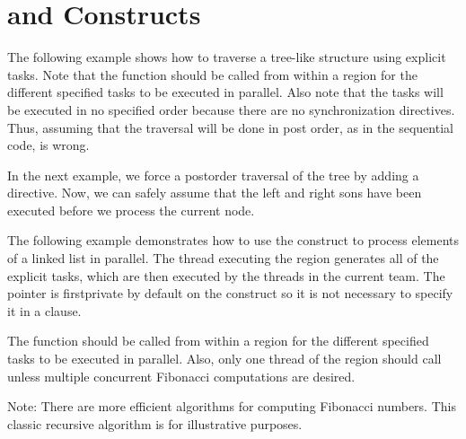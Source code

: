 \pagebreak
\section{ and  Constructs}
\label{sec:task_taskwait}

The following example shows how to traverse a tree-like structure using explicit 
tasks. Note that the  function should be called from within a 
 region for the different specified tasks to be executed in parallel. Also 
note that the tasks will be executed in no specified order because there are no 
synchronization directives. Thus, assuming that the traversal will be done in post 
order, as in the sequential code, is wrong.



In the next example, we force a postorder traversal of the tree by adding a  
directive. Now, we can safely assume that the left and right sons have been executed 
before we process the current node.



The following example demonstrates how to use the  construct to process 
elements of a linked list in parallel. The thread executing the  
region generates all of the explicit tasks, which are then executed by the threads 
in the current team. The pointer  is firstprivate by default 
on the  construct so it is not necessary to specify it in a  
clause.
%



The  function should be called from within a  region 
for the different specified tasks to be executed in parallel. Also, only one thread 
of the  region should call  unless multiple concurrent 
Fibonacci computations are desired. 


\clearpage

Note: There are more efficient algorithms for computing Fibonacci numbers. This 
classic recursive algorithm is for illustrative purposes.

